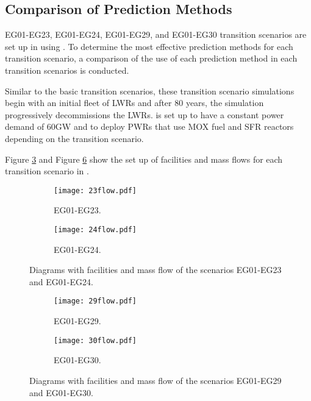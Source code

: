 \subsection{Comparison of Prediction Methods}

EG01-EG23, EG01-EG24, EG01-EG29, and EG01-EG30 transition scenarios
are set up in \Cyclus using \deploy. 
To determine the most effective \deploy prediction methods for 
each transition scenario, a
comparison of the use of each prediction method in each 
transition scenarios is conducted. 

Similar to the basic transition scenarios, these transition scenario 
simulations begin with an initial fleet of \gls{LWR}s and after 
80 years, the simulation progressively decommissions the \gls{LWR}s. 
\deploy is set up to have a constant power demand of 60GW and to 
deploy \gls{PWR}s that use \gls{MOX} fuel and \gls{SFR} reactors 
depending on the transition scenario. 

Figure \ref{fig:eg2324} and Figure \ref{fig:eg2930} 
show the set up of facilities and mass flows for 
each transition scenario in \Cyclus. 

\begin{figure}[]
	\centering
	\begin{subfigure}[t]{\textwidth}
		\centering
		\texttt{[image: 23flow.pdf]} 
		\caption{EG01-EG23.}
		\label{fig:23flow}
	\end{subfigure}
	\vspace{1cm}
	\begin{subfigure}[t]{\textwidth}
		\centering
		\texttt{[image: 24flow.pdf]} 
		\caption{EG01-EG24.}
		\label{fig:24flow}
	\end{subfigure}
	\hfill
	\caption{Diagrams with facilities and mass flow of the scenarios EG01-EG23 and EG01-EG24.}
	\label{fig:eg2324}
\end{figure}

\begin{figure}[]
	\centering
	\begin{subfigure}[t]{\textwidth}
		\centering
		\texttt{[image: 29flow.pdf]} 
		\caption{EG01-EG29.}
		\label{fig:29flow}
	\end{subfigure}
	\vspace{1cm}
	\begin{subfigure}[t]{\textwidth}
		\centering
		\texttt{[image: 30flow.pdf]} 
		\caption{EG01-EG30.}
		\label{fig:30flow}
	\end{subfigure}
	\hfill
	\caption{Diagrams with facilities and mass flow of the scenarios EG01-EG29 and EG01-EG30.}
	\label{fig:eg2930}
\end{figure}

